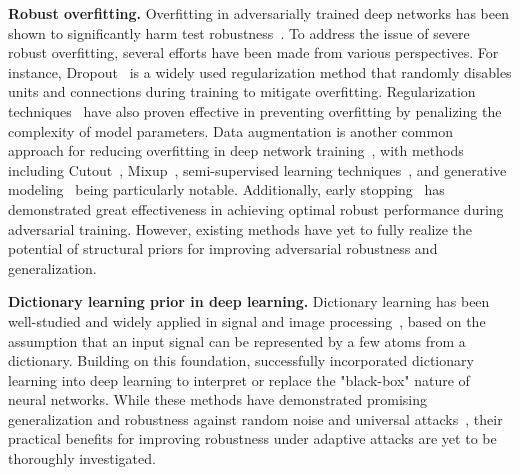 



\textbf{Robust overfitting. } Overfitting in adversarially trained deep networks has been shown to significantly harm test robustness~\cite{rice2020overfitting}. To address the issue of severe robust overfitting, several efforts have been made from various perspectives. For instance, Dropout~\cite{srivastava2014dropout} is a widely used regularization method that randomly disables units and connections during training to mitigate overfitting. 
Regularization techniques~\cite{andriushchenko2020understanding,qin2019adversarial,sriramanan2020guided} have also proven effective in preventing overfitting by penalizing the complexity of model parameters.
Data augmentation is another common approach for reducing overfitting in deep network training~\cite{schmidt2018adversarially}, with methods including Cutout~\cite{devries2017improved}, Mixup~\cite{zhang2017mixup}, semi-supervised learning techniques~\cite{carmon2019unlabeled, zhai2019adversarially}, and generative modeling~\cite{wang2023better,gowal2021improving} being particularly notable. Additionally, early stopping~\cite{rice2020overfitting} has demonstrated great effectiveness in achieving optimal robust performance during adversarial training. However, existing methods have yet to fully realize the potential of structural priors for improving adversarial robustness and generalization.

\textbf{Dictionary learning prior in deep learning.} Dictionary learning has been well-studied and widely applied in signal and image processing~\cite{olshausen1996emergence, wright2008robust, wright2020dense, zhao2011background, yang2011robust, lu2013online, chen2013robust, jiang2015robust, yang2011robust}, based on the assumption that an input signal can be represented by a few atoms from a dictionary. Building on this foundation, \citet{papyan2017convolutional, cazenavette2021architectural, mahdizadehaghdam2019deep, li2022revisiting} successfully incorporated dictionary learning into deep learning to interpret or replace the "black-box" nature of neural networks. 
While these methods have demonstrated promising generalization and robustness against random noise and universal attacks~\cite{li2022revisiting, mahdizadehaghdam2019deep}, their practical benefits for improving robustness under adaptive attacks are yet to be thoroughly investigated.

